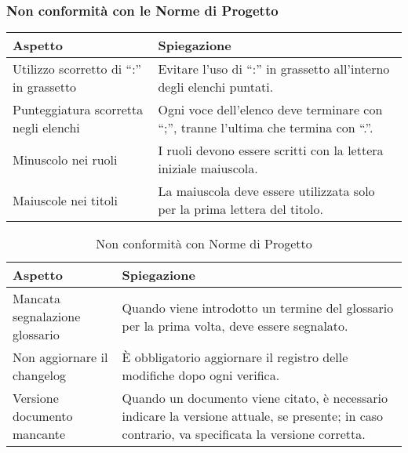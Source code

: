 \subsubsection{Non conformità con le Norme di Progetto}
\begin{table}[h!]
    \centering
    \renewcommand{\arraystretch}{1.5} %
    \begin{tabularx}{\textwidth}{|p{}|X|}
    \hline
    \rowcolor[HTML]{FFD700}
    \textbf{Aspetto} & \textbf{Spiegazione} \\ \hline
    Utilizzo scorretto di “:” in grassetto & Evitare l'uso di “:” in grassetto all'interno degli elenchi puntati. \\ \hline
    Punteggiatura scorretta negli elenchi & Ogni voce dell'elenco deve terminare con “;”, tranne l'ultima che termina con “.”. \\ \hline
    Minuscolo nei ruoli & I ruoli devono essere scritti con la lettera iniziale maiuscola. \\ \hline
    Maiuscole nei titoli & La maiuscola deve essere utilizzata solo per la prima lettera del titolo. \\ \hline
\end{tabularx}
\end{table}
    

\begin{table}[h!]
    \centering
    \renewcommand{\arraystretch}{1.5} %
    \begin{tabularx}{\textwidth}{|p{}|X|}
    \hline
    \rowcolor[HTML]{FFD700}
    \textbf{Aspetto} & \textbf{Spiegazione} \\ \hline
    Mancata segnalazione glossario & Quando viene introdotto un termine del glossario per la prima volta, deve essere segnalato. \\ \hline
    Non aggiornare il changelog & È obbligatorio aggiornare il registro delle modifiche dopo ogni verifica. \\ \hline
    Versione documento mancante & Quando un documento viene citato, è necessario indicare la versione attuale, se presente; in caso contrario, va specificata la versione corretta. \\ \hline
    \end{tabularx}
    \caption{Non conformità con Norme di Progetto}
\end{table}

\newpage
